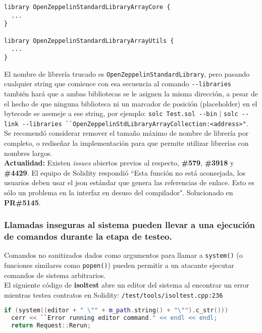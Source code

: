 \begin{lstlisting}[language=Solidity]
library OpenZeppelinStandardLibraryArrayCore {
  ...
}

library OpenZeppelinStandardLibraryArrayUtils {
  ...
}
\end{lstlisting}

El nombre de librería trucado es \verb|OpenZeppelinStandardLibrary|, pero pasando cualquier string que comience con esa secuencia al comando \verb|--libraries| también hará que a ambas bibliotecas se le asignen la misma dirección, a pesar de el hecho de que ninguna biblioteca ni un marcador de posición (placeholder) en el bytecode se asemeje a ese string, por ejemplo: \verb|solc Test.sol --bin| $\vert$ \verb|solc --link --libraries ``OpenZeppelinStdLibraryArrayCollection:<address>"|.\\

Se recomendó considerar remover el tamaño máximo de nombre de librería por completo, o rediseñar la implementación para que permite utilizar librerías con nombres largos.\\

\textbf{Actualidad:} Existen \textit{issues} abiertos previos al respecto, \textbf{\#579}\cite{GHI579}, \textbf{\#3918}\cite{GHI3918} y \textbf{\#4429}\cite{GHI4429}. El equipo de Solidity respondió ``Esta función no está aconsejada, los usuarios deben usar el json estándar que genera las referencias de enlace. Esto es sólo un problema en la interfaz en desuso del compilador". Solucionado en \textbf{PR\#5145}\cite{GHPR5145}.\\

\subsubsection{Llamadas inseguras al sistema pueden llevar a una ejecución de comandos durante la etapa de testeo.}

Comandos no sanitizados dados como argumentos para llamar a \texttt{system()} (o funciones similares como \texttt{popen()}) pueden permitir a un atacante ejecutar comandos de sistema arbitrarios.\\

El siguiente código de \textbf{isoltest} abre un editor del sistema al encontrar un error mientras testea contratos en Solidity:
\verb|/test/tools/isoltest.cpp:236|

\begin{lstlisting}[language=c++]
if (system((editor + " \"" + m_path.string() + "\"").c_str()))
  cerr << ``Error running editor command." << endl << endl;
  return Request::Rerun;
\end{lstlisting}

